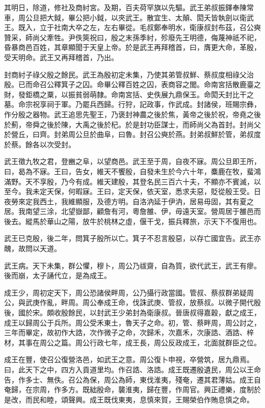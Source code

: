 其明日，除道，修社及商紂宮。及期，百夫荷罕旗以先驅。武王弟叔振鐸奉陳常車，周公旦把大鉞，畢公把小鉞，以夾武王。散宜生、太顛、閎夭皆執劍以衛武王。既入，立于社南大卒之左，左右畢從。毛叔鄭奉明水，衛康叔封布茲，召公奭贊采，師尚父牽牲。尹佚筴祝曰，殷之末孫季紂，殄廢先王明德，侮蔑神祇不祀，昏暴商邑百姓，其章顯聞于天皇上帝。於是武王再拜稽首，曰，膺更大命，革殷，受天明命。武王又再拜稽首，乃出。

封商紂子祿父殷之餘民。武王為殷初定未集，乃使其弟管叔鮮、蔡叔度相祿父治殷。已而命召公釋箕子之囚。命畢公釋百姓之囚，表商容之閭。命南宮括散鹿臺之財，發鉅橋之粟，以振貧弱萌隸。命南宮括、史佚展九鼎保玉。命閎夭封比干之墓。命宗祝享祠于軍。乃罷兵西歸。行狩，記政事，作武成。封諸侯，班賜宗彝，作分殷之器物。武王追思先聖王，乃褒封神農之後於焦，黃帝之後於祝，帝堯之後於薊，帝舜之後於陳，大禹之後於杞。於是封功臣謀士，而師尚父為首封。封尚父於營丘，曰齊。封弟周公旦於曲阜，曰魯。封召公奭於燕。封弟叔鮮於管，弟叔度於蔡。餘各以次受封。

武王徵九牧之君，登豳之阜，以望商邑。武王至于周，自夜不寐。周公旦即王所，曰，曷為不寐。王曰，告女，維天不饗殷，自發未生於今六十年，麋鹿在牧，蜚鴻滿野。天不享殷，乃今有成。維天建殷，其登名民三百六十夫，不顯亦不賓滅，以至今。我未定天保，何暇寐。王曰，定天保，依天室，悉求夫惡，貶從殷王受。日夜勞來定我西土，我維顯服，及德方明。自洛汭延于伊汭，居易毋固，其有夏之居。我南望三涂，北望嶽鄙，顧詹有河，粵詹雒、伊，毋遠天室。營周居于雒邑而後去。縱馬於華山之陽，放牛於桃林之虛，偃干戈，振兵釋旅，示天下不復用也。

武王已克殷，後二年，問箕子殷所以亡。箕子不忍言殷惡，以存亡國宜告。武王亦醜，故問以天道。

武王病。天下未集，群公懼，穆卜，周公乃祓齋，自為質，欲代武王，武王有瘳。後而崩，太子誦代立，是為成王。

成王少，周初定天下，周公恐諸侯畔周，公乃攝行政當國。管叔、蔡叔群弟疑周公，與武庚作亂，畔周。周公奉成王命，伐誅武庚、管叔，放蔡叔。以微子開代殷後，國於宋。頗收殷餘民，以封武王少弟封為衛康叔。晉唐叔得嘉穀，獻之成王，成王以歸周公于兵所。周公受禾東土，魯天子之命。初，管、蔡畔周，周公討之，三年而畢定，故初作大誥，次作微子之命，次歸禾，次嘉禾，次康誥、酒誥、梓材，其事在周公之篇。周公行政七年，成王長，周公反政成王，北面就群臣之位。

成王在豐，使召公復營洛邑，如武王之意。周公復卜申視，卒營筑，居九鼎焉。曰，此天下之中，四方入貢道里均。作召誥、洛誥。成王既遷殷遺民，周公以王命告，作多士、無佚。召公為保，周公為師，東伐淮夷，殘奄，遷其君薄姑。成王自奄歸，在宗周，作多方。既絀殷命，襲淮夷，歸在豐，作周官。興正禮樂，度制於是改，而民和睦，頌聲興。成王既伐東夷，息慎來賀，王賜榮伯作賄息慎之命。

